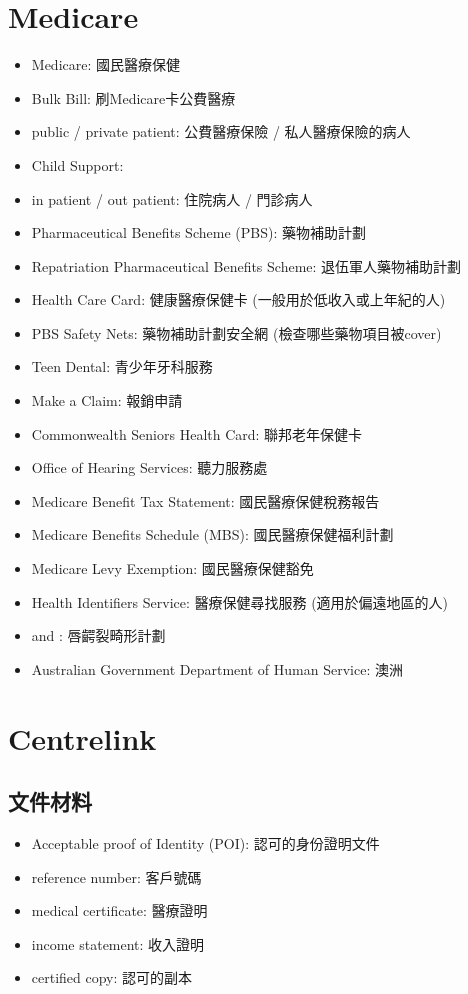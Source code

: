 \section{Medicare}
\begin{itemize}
  \itemsep0em
  \item Medicare: 國民醫療保健
  \item Bulk Bill: 刷Medicare卡公費醫療
  \item public / private patient: 公費醫療保險 / 私人醫療保險的病人
  \item Child Support: 
  \item in patient / out patient: 住院病人 / 門診病人
  \item Pharmaceutical Benefits Scheme (PBS): 藥物補助計劃
  \item Repatriation Pharmaceutical Benefits Scheme: 退伍軍人藥物補助計劃
  \item Health Care Card: 健康醫療保健卡 (一般用於低收入或上年紀的人)
  \item PBS Safety Nets: 藥物補助計劃安全網 (檢查哪些藥物項目被cover)
  \item Teen Dental: 青少年牙科服務
  \item Make a Claim: 報銷申請
  \item Commonwealth Seniors Health Card: 聯邦老年保健卡
  \item Office of Hearing Services: 聽力服務處
  \item Medicare Benefit Tax Statement: 國民醫療保健稅務報告
  \item Medicare Benefits Schedule (MBS): 國民醫療保健福利計劃
  \item Medicare Levy Exemption: 國民醫療保健豁免
  \item Health Identifiers Service: 醫療保健尋找服務 (適用於偏遠地區的人)
  \item {} and : 唇齶裂畸形計劃
  \item Australian Government Department of Human Service: 澳洲
\end{itemize}

\section{Centrelink}
\subsection*{文件材料}
\begin{multicols}{2}
\begin{itemize}
  \itemsep0em
  \item Acceptable proof of Identity (POI): 認可的身份證明文件
  \item reference number: 客戶號碼
  \item medical certificate: 醫療證明
  \item income statement: 收入證明
  \item certified copy: 認可的副本
\end{itemize}
\end{multicols}

